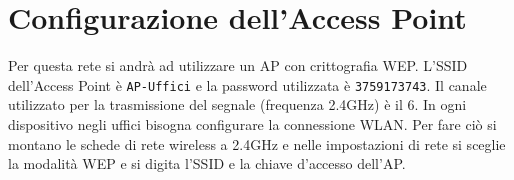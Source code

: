 \section{Configurazione dell'Access Point}
\hspace{24pt}Per questa rete si andrà ad utilizzare un AP con crittografia WEP. L'SSID dell'Access Point è \texttt{AP-Uffici} e la password utilizzata è \texttt{3759173743}. Il canale utilizzato per la trasmissione del segnale (frequenza 2.4GHz) è il 6. In ogni dispositivo negli uffici bisogna configurare la connessione WLAN. Per fare ciò si montano le schede di rete wireless a 2.4GHz e nelle impostazioni di rete si sceglie la modalità WEP e si digita l'SSID e la chiave d'accesso dell'AP.